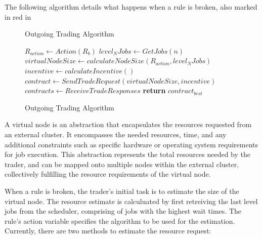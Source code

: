The following algorithm details what happens when a rule is broken, also marked
in red in  

\begin{figure}[H]
\begin{algorithm}[H]
\caption{Outgoing Trading Algorithm}
\begin{algorithmic}
   
    \State $R_{action} \gets Action(R_b)$
    \State $level_N Jobs \gets GetJobs(n)$ 
    \State $virtualNodeSize \gets calculateNodeSize(R_{action}, level_N Jobs)$
      \State $incentive \gets calculateIncentive()$
    \EndIf
      \State $contract \gets SendTradeRequest(virtualNodeSize, incentive)$
    \EndFor
    \State $contracts \gets ReceiveTradeResponses$ 
    \State \textbf{return} $contract_{best}$
  \EndProcedure
\end{algorithmic}
\end{algorithm}
\caption{Outgoing Trading Algorithm}
\end{figure}

A virtual node is an abstraction that encapsulates the resources requested from
an external cluster. It encompasses the needed resources, time, and any
additional constraints such as specific hardware or operating system
requirements for job execution. This abstraction represents the total resources
needed by the trader, and can be mapped onto multiple nodes within the external
cluster, collectively fulfilling the resource requirements of the virtual node.


When a rule is broken, the trader's initial task is to estimate the size of the
virtual node. The resource estimate is calculuated by first retreiving the last
level jobs from the scheduler, comprising of jobs with the highest wait times.
The rule's action variable specifies the algorithm to be used for the estimation.
Currently, there are two methods to estimate the resource request:

